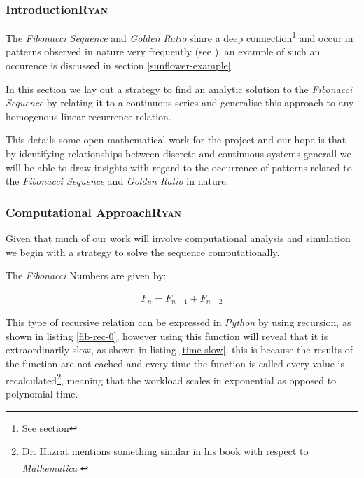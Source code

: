 \documentclass[11pt]{article}
\begin{document}
\subsubsection{Introduction\hfill{}\textsc{Ryan}}
\label{sec:org45aa390}
The \emph{Fibonacci Sequence} and \emph{Golden Ratio} share a deep connection\footnote{See section} and occur in patterns observed in nature very frequently
(see
\cite{shellyallenFibonacciNature,benedettapalazzoNumbersNatureFibonacci2016,MinarovaNikoletta2014TFSN,NatureGoldenRatio2018,robertlambHowAreFibonacci2008,ronknottFibonacciNumbersGolden2016}), an example of such an occurence is discussed in section \ref{sunflower-example}.


In this section we lay out a strategy to find an analytic solution to the
\emph{Fibonacci Sequence} by relating it to a continuous series and generalise this
approach to any homogenous linear recurrence relation.

This details some open mathematical work for the project and our hope is that by
identifying relationships between discrete and continuous systems generall we
will be able to draw insights with regard to the occurrence of patterns related
to the \emph{Fibonacci Sequence} and \emph{Golden Ratio} in nature.

\subsubsection{Computational Approach\hfill{}\textsc{Ryan}}
\label{define-the-fibonacci-numbers}
Given that much of our work will involve computational analysis and simulation we begin with a strategy to solve the sequence computationally.

The \emph{Fibonacci} Numbers are given by:

\begin{align}
F_n = F_{n-1} + F_{n-2} \label{eq:fib-def}
\end{align}

This type of recursive relation can be expressed in \emph{Python} by using recursion,
as shown in listing \ref{fib-rec-0}, however using this function will reveal that it
is extraordinarily slow, as shown in listing \ref{time-slow}, this is because the
results of the function are not cached and every time the function is called
every value is recalculated\footnote{Dr. Hazrat mentions something similar in his book with respect to
\emph{Mathematica}\textsuperscript{\textregistered}
\cite[Ch. 13]{hazratMathematicaProblemCenteredApproach2015}}, meaning that the workload scales in
exponential as opposed to polynomial time.
\end{document}
